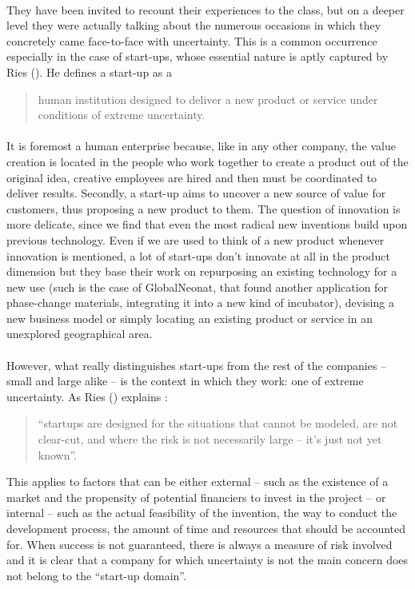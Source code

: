\documentclass[twoside]{report}
\begin{document}
\paragraph{}
They have been invited to recount their experiences to the class, but on a deeper level they were actually talking about the numerous occasions in which they concretely came face-to-face with uncertainty. This is a common occurrence especially in the case of start-ups, whose essential nature is aptly captured by Ries (\cite{ries_what_2010}). He defines a start-up as a \begin{quote}human institution designed to deliver a new product or service under conditions of extreme uncertainty.\end{quote}
\paragraph{}
It is foremost a human enterprise because, like in any other company, the value creation is located in the people who work together to create a product out of the original idea, creative employees are hired and then must be coordinated to deliver results.  Secondly, a start-up aims to uncover a new source of value for customers, thus proposing a new product to them. The question of innovation is more delicate, since we find that even the most radical new inventions build upon previous technology. Even if we are used to think of a new product whenever innovation is mentioned, a lot of start-ups don’t innovate at all in the product dimension but they base their work on repurposing an existing technology for a new use (such is the case of GlobalNeonat, that found another application for phase-change materials, integrating it into a new kind of incubator), devising a new business model or simply locating an existing product or service in an unexplored geographical area. 
\paragraph{}
However, what really distinguishes start-ups from the rest of the companies – small and large alike – is the context in which they work: one of extreme uncertainty. As Ries (\cite{ries_what_2010}) explains : \begin{quote}“startups are designed for the situations that cannot be modeled, are not clear-cut, and where the risk is not necessarily large – it’s just not yet known”.\end{quote} This applies to factors that can be either external – such as the existence of a market and the propensity of potential financiers to invest in the project – or internal – such as the actual feasibility of the invention, the way to conduct the development process, the amount of time and resources that should be accounted for. When success is not guaranteed, there is always a measure of risk involved and it is clear that a company for which uncertainty is not the main concern does not belong to the “start-up domain”.
\end{document}
